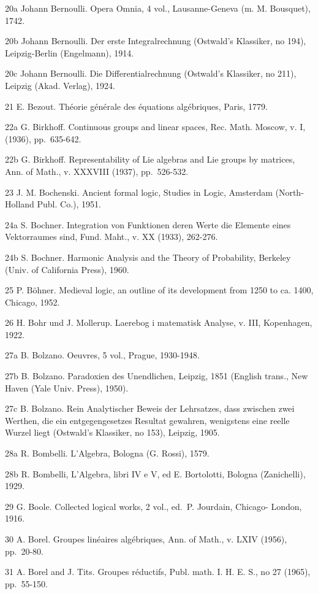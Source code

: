 20a Johann Bernoulli. Opera Omnia, 4 vol., Lausanne-Geneva (m. M. Bousquet), 1742.

20b Johann Bernoulli. Der erste Integralrechnung (Ostwald's Klassiker, no 194), Leipzig-Berlin (Engelmann), 1914.

20c Johann Bernoulli. Die Differentialrechnung (Ostwald's Klassiker, no 211), Leipzig (Akad. Verlag), 1924.

21 E. Bezout. Théorie générale des équations algébriques, Paris, 1779.

22a G. Birkhoff. Continuous groups and linear spaces, Rec. Math. Moscow, v. I, (1936), pp.~635-642.

22b G. Birkhoff. Representability of Lie algebras and Lie groups by matrices, Ann. of Math., v. XXXVIII (1937), pp.~526-532.

23 J. M. Bochenski. Ancient formal logic, Studies in Logic, Amsterdam (North-Holland Publ. Co.), 1951.

24a S. Bochner. Integration von Funktionen deren Werte die Elemente eines Vektorraumes sind, Fund. Maht., v. XX (1933), 262-276.

24b S. Bochner. Harmonic Analysis and the Theory of Probability, Berkeley (Univ. of California Press), 1960.

25 P. Böhner. Medieval logic, an outline of its development from 1250 to ca. 1400, Chicago, 1952.

26 H. Bohr und J. Mollerup. Laerebog i matematisk Analyse, v. III, Kopenhagen, 1922.

27a B. Bolzano. Oeuvres, 5 vol., Prague, 1930-1948.

27b B. Bolzano. Paradoxien des Unendlichen, Leipzig, 1851 (English trans., New Haven (Yale Univ. Press), 1950).

27c B. Bolzano. Rein Analytischer Beweis der Lehrsatzes, dass zwischen zwei Werthen, die ein entgegengesetzes Resultat gewahren, wenigstens eine reelle Wurzel liegt (Ostwald's Klassiker, no 153), Leipzig, 1905.

28a R. Bombelli. L'Algebra, Bologna (G. Rossi), 1579.

28b R. Bombelli, L'Algebra, libri IV e V, ed E. Bortolotti, Bologna (Zanichelli), 1929.

29 G. Boole. Collected logical works, 2 vol., ed.~P. Jourdain, Chicago- London, 1916.

30 A. Borel. Groupes linéaires algébriques, Ann. of Math., v. LXIV (1956), pp.~20-80.

31 A. Borel and J. Tits. Groupes réductifs, Publ. math. I. H. E. S., no 27 (1965), pp.~55-150.

